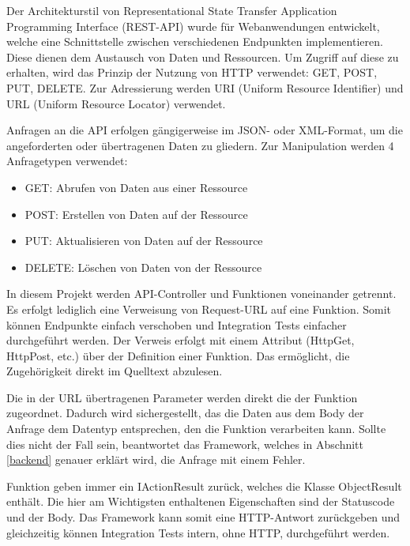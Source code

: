 Der Architekturstil von Representational State Transfer Application Programming Interface (REST-API) wurde für Webanwendungen entwickelt, welche eine Schnittstelle zwischen verschiedenen Endpunkten implementieren. Diese dienen dem Austausch von Daten und Ressourcen. Um Zugriff auf diese zu erhalten, wird das Prinzip der Nutzung von HTTP verwendet: GET, POST, PUT, DELETE. Zur Adressierung werden URI (Uniform Resource Identifier) und URL (Uniform Resource Locator) verwendet.

Anfragen an die API erfolgen gängigerweise im JSON- oder XML-Format, um die angeforderten oder übertragenen Daten zu gliedern. Zur Manipulation werden 4 Anfragetypen verwendet:
\begin{itemize}
	\item GET: Abrufen von Daten aus einer Ressource
	\item POST: Erstellen von Daten auf der Ressource
	\item PUT: Aktualisieren von Daten auf der Ressource
	\item DELETE: Löschen von Daten von der Ressource
\end{itemize}

In diesem Projekt werden API-Controller und Funktionen voneinander getrennt.
Es erfolgt lediglich eine Verweisung von Request-URL auf eine Funktion.
Somit können Endpunkte einfach verschoben und Integration Tests einfacher durchgeführt werden.
Der Verweis erfolgt mit einem Attribut (HttpGet, HttpPost, etc.) über der Definition einer Funktion.
Das ermöglicht, die Zugehörigkeit direkt im Quelltext abzulesen.

Die in der URL übertragenen Parameter werden direkt die der Funktion zugeordnet.
Dadurch wird sichergestellt, das die Daten aus dem Body der Anfrage dem Datentyp entsprechen, den die Funktion verarbeiten kann.
Sollte dies nicht der Fall sein, beantwortet das Framework, welches in Abschnitt \ref{backend} genauer erklärt wird, die Anfrage mit einem Fehler.

Funktion geben immer ein IActionResult zurück, welches die Klasse ObjectResult enthält.
Die hier am Wichtigsten enthaltenen Eigenschaften sind der Statuscode und der Body.
Das Framework kann somit eine HTTP-Antwort zurückgeben und gleichzeitig können Integration Tests intern, ohne HTTP, durchgeführt werden.